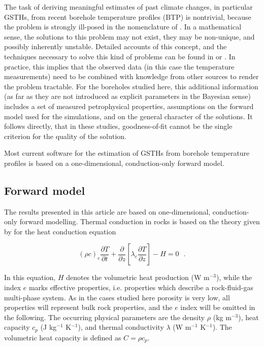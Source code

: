 \documentclass[cp]{copernicus}
\begin{document}
The task of deriving meaningful estimates of past climate changes, in particular GSTHs, from recent 
borehole temperature profiles (BTP) is nontrivial, because the problem is strongly ill-posed in the 
nomenclature of \citet{Hadamard1923a}. In a mathematical sense, the solutions to this problem may 
not exist, they may be non-unique, and possibly inherently unstable. Detailed accounts of this 
concept, and the techniques necessary to solve this kind of problems can be found in 
\citep{Hansen1998g, Hansen2010a} or \citep{Aster2019a}. In practice, this implies that the observed 
data (in this case the temperature measurements) need to be combined with knowledge from other 
sources to render the problem tractable. For the boreholes studied here, this additional 
information 
(as far as they are not introduced as explicit parameters in the Bayesian sense) includes a set of 
measured petrophysical properties, assumptions on the forward model used for the simulations, and 
on 
the general character of the solutions. It follows directly, that in these studies, goodness-of-fit 
cannot be the single criterion for the quality of the solution. 

Most current software for the estimation of GSTHs from borehole temperature profiles is based on a 
one-dimensional, conduction-only forward model.



\subsection{Forward model}
\label{sec:fwd}
The results presented in this article are based on one-dimensional, conduction-only forward 
modelling. Thermal conduction in rocks is based on the theory given by \citet{Carslaw1959a} for 
the heat conduction equation 

\begin{equation}\label{eqn:1}
 {\left( {\rho c} \right)_e}\frac{{\partial T}}{{\partial t}} + \frac{\partial 
}{{\partial z}}\left[ {{\lambda _e}\frac{{\partial T}}{{\partial z}}} \right] - 
H = 0{\text{ }.}
\end{equation} 

In this equation, $H$ denotes the volumetric heat production (W m$^{-3}$), while the index $e$ 
marks 
effective properties, i.e. properties which describe a rock-fluid-gas multi-phase system. As in the 
cases studied here porosity is very low, all properties will represent bulk rock properties, and 
the 
$e$ index will be omitted in the following. The occurring physical parameters are the density 
$\rho$ 
(kg m$^{-3}$), heat capacity $c_p$ (J kg$^{-1}$ K$^{-1}$), and thermal conductivity $\lambda$ (W 
m$^{-1}$ K$^{-1}$). The volumetric heat capacity is defined as $C = \rho c_p$. 
\end{document}
